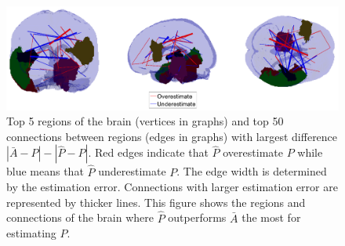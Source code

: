 \documentclass[a4paper]{article}
\begin{document}
\begin{figure}[!htb]
\centering
\includegraphics[width=1\textwidth]{Diff_between_desikan.png}
\caption{Top 5 regions of the brain (vertices in graphs) and top 50 connections between regions (edges in graphs) with largest difference $|\bar{A} - P| - |\hat{P} - P|$. Red edges indicate that $\hat{P}$ overestimate $P$ while blue means that $\hat{P}$ underestimate $P$. The edge width is determined by the estimation error. Connections with larger estimation error are represented by thicker lines. This figure shows the regions and connections of the brain where $\hat{P}$ outperforms $\bar{A}$ the most for estimating $P$.}
\label{fig:Diff_between_desikan}
\end{figure}
\end{document}
